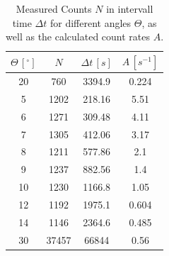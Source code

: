 \begin{table}[H]
	\centering
	\caption{Measured Counts $N$ in intervall time $\Delta t$ for different angles $\Theta$, as well as the calculated count rates $A$.}
	\label{tab:big_angles}
	\begin{tabular}{c | c | c | c}
		\toprule
		$\Theta \, [^{\circ}]$ & $N$ & $\Delta t \, [s] $ & $A \, [s^{-1}]$\\
		\midrule
		20 & 760 & 3394.9 & 0.224 \\
		 5 & 1202 & 218.16 & 5.51 \\
		 6 & 1271 & 309.48 & 4.11 \\
		 7 & 1305 & 412.06 & 3.17 \\
		 8 & 1211 & 577.86 & 2.1 \\
		 9 & 1237 & 882.56 & 1.4 \\
		 10 & 1230 & 1166.8 & 1.05 \\
		 12 & 1192 & 1975.1 & 0.604 \\
		 14 & 1146 & 2364.6 & 0.485 \\
		 30 & 37457 & 66844 & 0.56 \\
		 \bottomrule
	\end{tabular}
\end{table}
